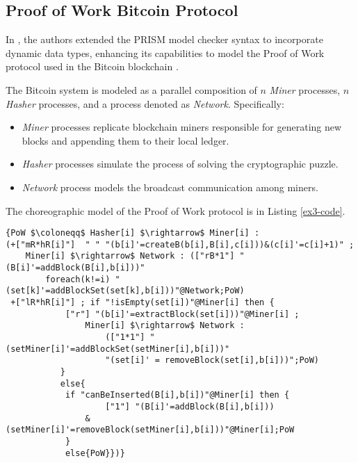 \subsection{Proof of Work Bitcoin Protocol}
\begin{comment}
\begin{wrapfigure}[11]{r}{4cm}
	\texttt{[image: bitcoin.pdf]}	
\end{wrapfigure} 
\end{comment}
In \cite{DBLP:journals/concurrency/BistarelliNGLMV23}, the authors extended the PRISM model checker syntax to incorporate dynamic data types, enhancing its capabilities to model the Proof of Work protocol used in the Bitcoin blockchain \cite{bitcoin}. 

The Bitcoin system is modeled as a parallel composition of $n$ \emph{Miner} processes, $n$ \emph{Hasher} processes, and a process denoted as \emph{Network}. Specifically:
\begin{itemize}
\item \emph{Miner} processes replicate blockchain miners responsible for generating new blocks and appending them to their local ledger.
\item \emph{Hasher} processes simulate the process of solving the cryptographic puzzle.
\item \emph{Network} process models the broadcast communication among miners.
\end{itemize}
The choreographic model of the Proof of Work protocol is in Listing \ref{ex3-code}.
\begin{lstlisting}[style=chor-color,breaklines=true, postbreak=\mbox{\textcolor{red}{$\hookrightarrow$}\space},caption={Choreographic language for the Proof of Work Bitcoin Protocol},captionpos=b,label={ex3-code}]
{PoW $\coloneqq$ Hasher[i] $\rightarrow$ Miner[i] :
(+["mR*hR[i]"]  " " "(b[i]'=createB(b[i],B[i],c[i]))&(c[i]'=c[i]+1)" ; 
	Miner[i] $\rightarrow$ Network : (["rB*1"] "(B[i]'=addBlock(B[i],b[i]))"   
		foreach(k!=i) "(set[k]'=addBlockSet(set[k],b[i]))"@Network;PoW)
 +["lR*hR[i]"] ; if "!isEmpty(set[i])"@Miner[i] then { 
  	   		["r"] "(b[i]'=extractBlock(set[i]))"@Miner[i] ;  
				Miner[i] $\rightarrow$ Network : 
					(["1*1"] "(setMiner[i]'=addBlockSet(setMiner[i],b[i]))"
		 			"(set[i]' = removeBlock(set[i],b[i]))";PoW) 
 		   }
 		   else{
 	   		if "canBeInserted(B[i],b[i])"@Miner[i] then { 
 	      			["1"] "(B[i]'=addBlock(B[i],b[i]))
				&(setMiner[i]'=removeBlock(setMiner[i],b[i]))"@Miner[i];PoW 
 	   		}
	   		else{PoW}})} 
\end{lstlisting}
